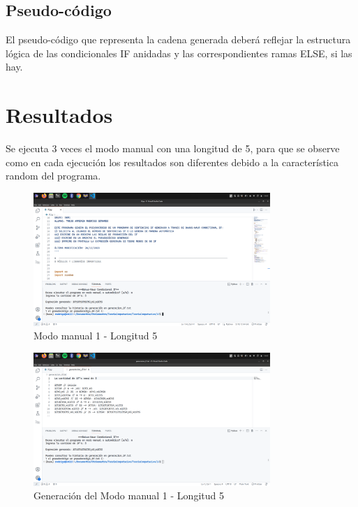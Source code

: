 \documentclass[11pt]{article} %
\begin{document}
	\subsection*{Pseudo-código}
	El pseudo-código que representa la cadena generada deberá reflejar la estructura lógica de las condicionales IF anidadas y las correspondientes ramas ELSE, si las hay.
	
	
	
	\section{Resultados}
	
	Se ejecuta 3 veces el modo manual con una longitud de 5, para que se observe como en cada ejecución los resultados son diferentes debido a la característica random del programa.
	
	
	\begin{figure}[h]
		\centering
		\includegraphics[width=0.8\textwidth]{manual1.png}
		\caption{Modo manual 1 - Longitud 5}
	\end{figure}
	

	
	\newpage
	
	\begin{figure}[h]
		\centering
		\includegraphics[width=0.8\textwidth]{arch1,1}
		\caption{Generación del Modo manual 1 - Longitud 5}
	\end{figure}
	
\end{document}
